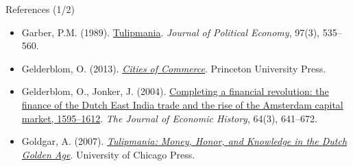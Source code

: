 \begin{frame}{References (1/2)}
\begin{itemize}
    \item Garber, P.M. (1989). \href{https://doi.org/10.1086/261615}{Tulipmania}. \emph{Journal of Political Economy}, 97(3), 535--560.
    \item Gelderblom, O. (2013). \href{https://doi.org/10.23943/princeton/9780691142883.001.0001}{\emph{Cities of Commerce}}. Princeton University Press.
    \item Gelderblom, O., Jonker, J. (2004). \href{https://doi.org/10.1017/S002205070400292X}{Completing a financial revolution: the finance of the Dutch East India trade and the rise of the Amsterdam capital market, 1595--1612}. \emph{The Journal of Economic History}, 64(3), 641--672.
    \item Goldgar, A. (2007). \href{https://doi.org/10.7208/chicago/9780226301303.001.0001}{\emph{Tulipmania: Money, Honor, and Knowledge in the Dutch Golden Age}}. University of Chicago Press.
\end{itemize}
\end{frame}

